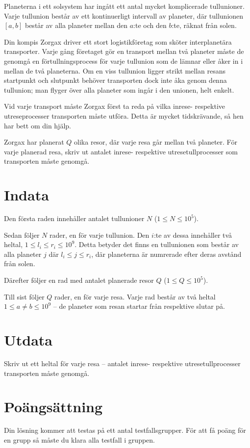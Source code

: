 Planeterna i ett solsystem har ingått ett antal mycket komplicerade tullunioner.
Varje tullunion består av ett kontinuerligt intervall av planeter, där tullunionen $[a, b]$ består av alla planeter mellan den $a$:te och den $b$:te, räknat från solen.

Din kompis Zorgax driver ett stort logistikföretag som sköter interplanetära transporter.
Varje gång företaget gör en transport mellan två planeter måste de genomgå en förtullningsprocess för varje tullunion som de lämnar eller åker in i mellan de två planeterna.
Om en viss tullunion ligger strikt mellan resans startpunkt och slutpunkt behöver transporten dock inte åka genom denna tullunion; man flyger över alla planeter som ingår i den unionen, helt enkelt.

Vid varje transport måste Zorgax först ta reda på vilka inrese- respektive utreseprocesser transporten måste utföra.
Detta är mycket tidskrävande, så hen har bett om din hjälp.

Zorgax har planerat $Q$ olika resor, där varje resa går mellan två planeter.
För varje planerad resa, skriv ut antalet inrese- respektive utresetullprocesser som transporten måste genomgå. 


\section*{Indata}
Den första raden innehåller antalet tullunioner $N$ ($1 \le N \le 10^5$).

Sedan följer $N$ rader, en för varje tullunion.
Den $i$:te av dessa innehåller två heltal, $1 \le l_i \leq r_i \le 10^9$.
Detta betyder det finns en tullunionen som består av alla planeter $j$ där $l_i \leq j \leq r_i$, där planeterna är numrerade efter deras avstånd från solen.

Därefter följer en rad med antalet planerade resor $Q$ ($1 \le Q \le 10^5$).

Till sist följer $Q$ rader, en för varje resa.
Varje rad består av två heltal $1 \le a \neq b \le 10^9$ -- de planeter som resan startar från respektive slutar på.

\section*{Utdata}
Skriv ut ett heltal för varje resa -- antalet inrese- respektive utresetullprocesser transporten måste genomgå.

\section*{Poängsättning}
Din lösning kommer att testas på ett antal testfallsgrupper.
För att få poäng för en grupp så måste du klara alla testfall i gruppen.

